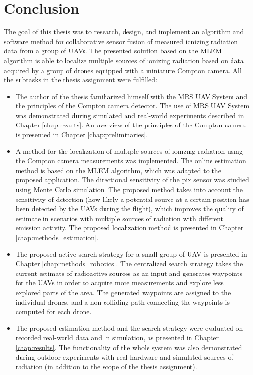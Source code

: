 
\chapter{Conclusion\label{chap:conclusion}}
The goal of this thesis was to research, design, and implement an algorithm and software method for collaborative sensor fusion of
measured ionizing radiation data from a group of \ac{UAV}s.
The presented solution based on the \ac{MLEM} algorithm is able to localize multiple sources of ionizing radiation based on data acquired by a group of drones equipped with a miniature Compton camera. All the subtasks in the thesis assignment were fulfilled:
\begin{itemize}
  \item The author of the thesis familiarized himself with the MRS UAV System and the principles of the Compton camera detector. 
The use of MRS UAV System was demonstrated during simulated and real-world experiments described in Chapter \ref{chap:results}. 
An overview of the principles of the Compton camera is presented in Chapter \ref{chap:preliminaries}.
  \item A method for the localization of multiple sources of ionizing radiation using the Compton camera measurements was implemented. 
The online estimation method is based on the \ac{MLEM} algorithm, which was adapted to the proposed application.
The directional sensitivity of the \ac{pix} sensor was studied using Monte Carlo simulation.
    The proposed method takes into account the sensitivity of detection (how likely a potential source at a certain position has been detected by the \ac{UAV}s during the flight), which improves the quality of estimate in scenarios with multiple sources of radiation with different emission activity.
The proposed localization method is presented in Chapter \ref{chap:methods_estimation}.
  \item The proposed active search strategy for a small group of \ac{UAV} is presented in Chapter \ref{chap:methods_robotics}.
    The centralized search strategy takes the current estimate of radioactive sources as an input and generates waypoints for the \ac{UAV}s in order to acquire more measurements and explore less explored parts of the area.         
    The generated waypoints are assigned to the individual drones, and a non-colliding path connecting the waypoints is computed for each drone.
  \item The proposed estimation method and the search strategy were evaluated on recorded real-world data and in simulation, as presented in Chapter \ref{chap:results}.
    The functionality of the whole system was also demonstrated during outdoor experiments with real hardware and simulated sources of radiation 
    (in addition to the scope of the thesis assignment). 
\end{itemize}

